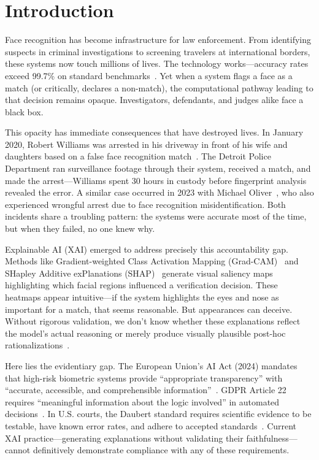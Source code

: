 \section{Introduction}

Face recognition has become infrastructure for law enforcement. From identifying suspects in criminal investigations to screening travelers at international borders, these systems now touch millions of lives. The technology works—accuracy rates exceed 99.7\% on standard benchmarks~\cite{deng2019arcface,grother2019frvt}. Yet when a system flags a face as a match (or critically, declares a non-match), the computational pathway leading to that decision remains opaque. Investigators, defendants, and judges alike face a black box.

This opacity has immediate consequences that have destroyed lives. In January 2020, Robert Williams was arrested in his driveway in front of his wife and daughters based on a false face recognition match~\cite{hill2020williams}. The Detroit Police Department ran surveillance footage through their system, received a match, and made the arrest—Williams spent 30 hours in custody before fingerprint analysis revealed the error. A similar case occurred in 2023 with Michael Oliver~\cite{hill2023oliver}, who also experienced wrongful arrest due to face recognition misidentification. Both incidents share a troubling pattern: the systems were accurate most of the time, but when they failed, no one knew why.

Explainable AI (XAI) emerged to address precisely this accountability gap. Methods like Gradient-weighted Class Activation Mapping (Grad-CAM)~\cite{selvaraju2017gradcam} and SHapley Additive exPlanations (SHAP)~\cite{lundberg2017shap} generate visual saliency maps highlighting which facial regions influenced a verification decision. These heatmaps appear intuitive—if the system highlights the eyes and nose as important for a match, that seems reasonable. But appearances can deceive. Without rigorous validation, we don't know whether these explanations reflect the model's actual reasoning or merely produce visually plausible post-hoc rationalizations~\cite{adebayo2018sanity}.

Here lies the evidentiary gap. The European Union's AI Act (2024) mandates that high-risk biometric systems provide ``appropriate transparency'' with ``accurate, accessible, and comprehensible information''~\cite{euaiact2024}. GDPR Article 22 requires ``meaningful information about the logic involved'' in automated decisions~\cite{gdpr2016}. In U.S. courts, the Daubert standard requires scientific evidence to be testable, have known error rates, and adhere to accepted standards~\cite{daubert1993}. Current XAI practice—generating explanations without validating their faithfulness—cannot definitively demonstrate compliance with any of these requirements.

